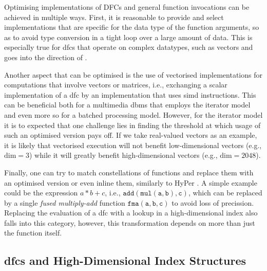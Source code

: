 Optimising implementations of DFCs and general function invocations can be achieved in multiple ways. First, it is reasonable to provide and select implementations that are specific for the data type of the function arguments, so as to avoid type conversion in a tight loop over a large amount of data. This is especially true for \acrshort{dfc}s that operate on complex datatypes, such as vectors and goes into the direction of . 

Another aspect that can be optimised is the use of vectorised implementations for computations that involve vectors or matrices, i.e., exchanging a scalar implementation of a \acrshort{dfc} by an implementation that uses \acrshort{simd} instructions. This can be beneficial both for a multimedia \acrshort{dbms} that employs the iterator model and even more so for a batched processing model. However, for the iterator model it is to expected that one challenge lies in finding the threshold at which usage of such an optimised version pays off. If we take real-valued vectors as an example, it is likely that vectorised execution will not benefit low-dimensional vectors (e.g., $\text{dim} = 3$) while it will greatly benefit high-dimensional vectors (e.g., $\text{dim} = 2048$).

Finally, one can try to match constellations of functions and replace them with an optimised version or even inline them, similarly to HyPer \cite{Blacher:2022Machine}. A simple example could be the expression $a * b + c$, i.e., $\mathtt{add}(\mathtt{mul}(\mathtt{a},\mathtt{b}), \mathtt{c})$, which can be replaced by a single \emph{fused multiply-add} function $\mathtt{fma}(\mathtt{a},\mathtt{b},\mathtt{c})$ to avoid loss of precission. Replacing the evaluation of a \acrshort{dfc} with a lookup in a high-dimensional index also falls into this category, however, this transformation depends on more than just the function itself.

\subsection{\texorpdfstring{\acrshort{dfc}s}{DFCs} and High-Dimensional Index Structures}
\label{section:dfc_and_indexes}

